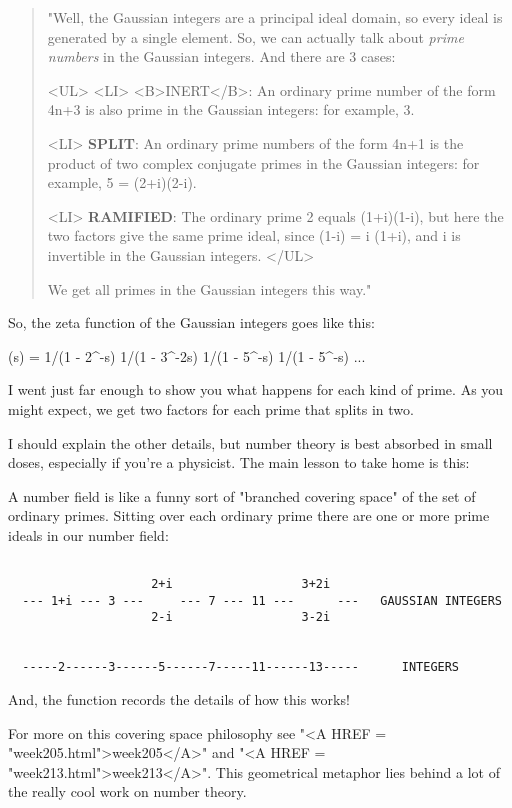 \begin{quote}
"Well, the Gaussian integers are a principal ideal domain, so every 
ideal is generated by a single element.  So, we can actually talk 
about \emph{prime numbers} in the Gaussian integers.  And there are 3 cases:

<UL>
<LI>
<B>INERT</B>: An ordinary prime number of the form 4n+3 is also prime 
 in the Gaussian integers: for example, 3.

<LI>
\textbf{SPLIT}: An ordinary prime numbers of the form 4n+1 is the product 
 of two complex conjugate primes in the Gaussian integers: for 
 example, 5 = (2+i)(2-i).

<LI>
\textbf{RAMIFIED}: The ordinary prime 2 equals (1+i)(1-i), but here the 
 two factors give the same prime ideal, since (1-i) = i (1+i), 
 and i is invertible in the Gaussian integers.
</UL>

We get all primes in the Gaussian integers this way."

\end{quote}
So, the zeta function of the Gaussian integers goes like this:

\zeta (s) = 1/(1 - 2^{-s})  1/(1 - 3^{-2s})  1/(1 - 5^{-s})  1/(1 - 5^{-s}) ...

I went just far enough to show you what happens for each kind of
prime.  As you might expect, we get two factors for each prime
that splits in two.

I should explain the other details, but number theory is best 
absorbed in small doses, especially if you're a physicist.  The 
main lesson to take home is this:

A number field is like a funny sort of "branched covering space" of 
the set of ordinary primes.  Sitting over each ordinary prime
there are one or more prime ideals in our number field:



\begin{verbatim}

                    2+i                  3+2i
  --- 1+i --- 3 ---     --- 7 --- 11 ---      ---   GAUSSIAN INTEGERS 
                    2-i                  3-2i           


  -----2------3------5------7-----11------13-----      INTEGERS

\end{verbatim}
    
And, the \zeta  function records the details of how this works!

For more on this covering space philosophy see "<A HREF = "week205.html">week205</A>" and "<A HREF = "week213.html">week213</A>".  
This geometrical metaphor lies behind a lot of the really cool work 
on number theory.

